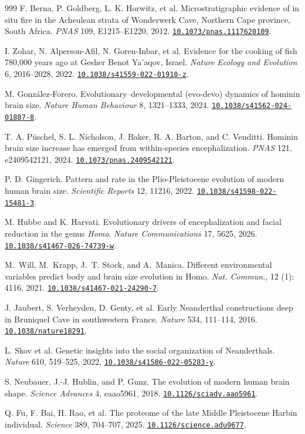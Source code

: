 \documentclass[10pt,twocolumn,letterpaper]{article}
\newcommand{\doi}[1]{\href{https://doi.org/#1}{\nolinkurl{#1}}}
\begin{document}
\begin{thebibliography}{999}
 F. Berna, P. Goldberg, L. K. Horwitz, et al. Microstratigraphic evidence of in situ fire in the Acheulean strata of Wonderwerk Cave, Northern Cape province, South Africa. \emph{PNAS} 109, E1215--E1220, 2012. \doi{10.1073/pnas.1117620109}.

 I. Zohar, N. Alperson-Afil, N. Goren-Inbar, et al. Evidence for the cooking of fish 780,000 years ago at Gesher Benot Ya'aqov, Israel. \emph{Nature Ecology and Evolution} 6, 2016--2028, 2022. \doi{10.1038/s41559-022-01910-z}.

 M. Gonz\'alez-Forero. Evolutionary--developmental (evo-devo) dynamics of hominin brain size. \emph{Nature Human Behaviour} 8, 1321--1333, 2024. \doi{10.1038/s41562-024-01887-8}.

 T. A. P\"uschel, S. L. Nicholson, J. Baker, R. A. Barton, and C. Venditti. Hominin brain size increase has emerged from within-species encephalization. \emph{PNAS} 121, e2409542121, 2024. \doi{10.1073/pnas.2409542121}.

 P. D. Gingerich. Pattern and rate in the Plio-Pleistocene evolution of modern human brain size. \emph{Scientific Reports} 12, 11216, 2022. \doi{10.1038/s41598-022-15481-3}.

 M. Hubbe and K. Harvati. Evolutionary drivers of encephalization and facial reduction in the genus \emph{Homo}. \emph{Nature Communications} 17, 5625, 2026. \doi{10.1038/s41467-026-74739-w}.

 M.~{Will}, M.~{Krapp}, J.~T. {Stock}, and A.~{Manica}. {Different environmental variables predict body and brain size evolution in Homo}. \emph{Nat. Commun.}, 12 (1): 4116, 2021. \doi{10.1038/s41467-021-24290-7}.

 J. Jaubert, S. Verheyden, D. Genty, et al. Early Neanderthal constructions deep in Bruniquel Cave in southwestern France. \emph{Nature} 534, 111--114, 2016. \doi{10.1038/nature18291}.

 L. Skov et al. Genetic insights into the social organization of Neanderthals. \emph{Nature} 610, 519--525, 2022. \doi{10.1038/s41586-022-05283-y}.

 S. Neubauer, J.-J. Hublin, and P. Gunz. The evolution of modern human brain shape. \emph{Science Advances} 4, eaao5961, 2018. \doi{10.1126/sciadv.aao5961}.

 Q. Fu, F. Bai, H. Rao, et al. The proteome of the late Middle Pleistocene Harbin individual. \emph{Science} 389, 704--707, 2025. \doi{10.1126/science.adu9677}.


\end{thebibliography}
\end{document}
